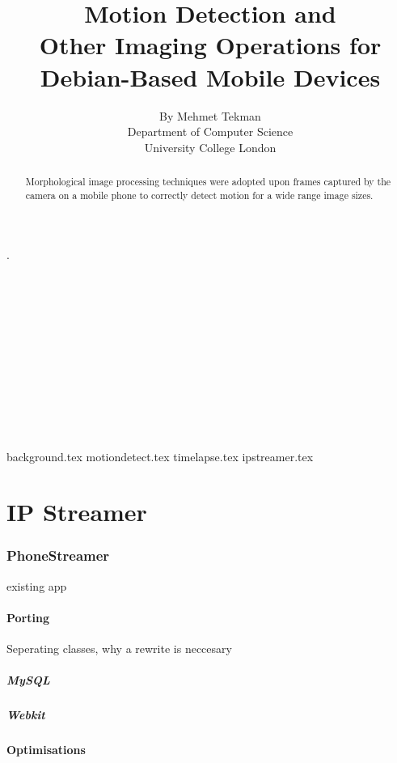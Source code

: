 \documentclass[11pt]{article} %
\title{\Huge Motion Detection and\\Other Imaging Operations for\\Debian-Based Mobile Devices }
\author{\small By Mehmet Tekman\\\small Department of Computer Science\\\small University College London}
\begin{document}
\maketitle 

\part*{}{\tiny .\\\\\\\\\\\\\\\\\\\\\\\\}

\begin{abstract}
 Morphological image processing techniques were adopted upon frames captured by the camera on a mobile phone to correctly detect motion for a wide range image sizes.
\end{abstract}

\pagebreak
\tableofcontents
\pagebreak

{background.tex}
{motiondetect.tex}
{timelapse.tex}
{ipstreamer.tex}

\part{IP Streamer}
\section{PhoneStreamer}{existing app}
\subsection{Porting}{Seperating classes, why a rewrite is neccesary}
\subsubsection{MySQL}
\subsubsection{Webkit}
\subsection{Optimisations}
\end{document}
